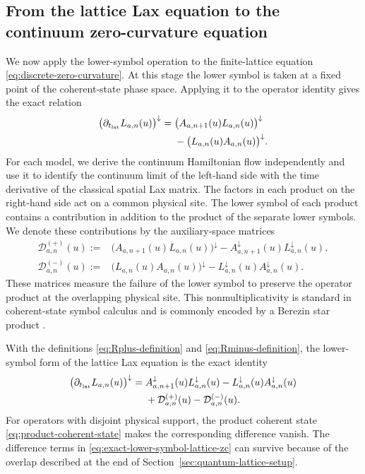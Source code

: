 \subsection{From the lattice Lax equation to the continuum zero-curvature equation}
\label{sec:lattice-to-continuum-zc}

We now apply the lower-symbol operation to the finite-lattice equation
\eqref{eq:discrete-zero-curvature}.  At this stage the lower symbol is taken at
a fixed point of the coherent-state phase space.  Applying it to the operator
identity gives the exact relation
\begin{align}
\bigl(\partial_{t_{\rm lat}}L_{a,n}(u)\bigr)^{\downarrow}
={}&
\bigl(A_{a,n+1}(u)L_{a,n}(u)\bigr)^{\downarrow}
\nonumber\\
&-
\bigl(L_{a,n}(u)A_{a,n}(u)\bigr)^{\downarrow}.
\label{eq:lower-symbol-discrete-zc}
\end{align}
For each model, we derive the continuum Hamiltonian flow independently and
use it to identify the continuum limit of the left-hand side with the time
derivative of the classical spatial Lax matrix.  The factors in each
product on the right-hand side act on a common physical site.  The lower
symbol of each product contains a contribution in addition to the product
of the separate lower symbols.  We denote these contributions by the
auxiliary-space matrices
\begin{align}
\mathcal D^{(+)}_{a,n}(u)
:={}&
\bigl(A_{a,n+1}(u)L_{a,n}(u)\bigr)^{\downarrow}
-
A_{a,n+1}^{\downarrow}(u)L_{a,n}^{\downarrow}(u),
\label{eq:Rplus-definition}\\
\mathcal D^{(-)}_{a,n}(u)
:={}&
\bigl(L_{a,n}(u)A_{a,n}(u)\bigr)^{\downarrow}
-
L_{a,n}^{\downarrow}(u)A_{a,n}^{\downarrow}(u).
\label{eq:Rminus-definition}
\end{align}
These matrices measure the failure of the lower symbol to preserve the
operator product at the overlapping physical site.  This nonmultiplicativity
is standard in coherent-state symbol calculus and is commonly encoded by a
Berezin star product \cite{Schlichenmaier2010}.

With the definitions \eqref{eq:Rplus-definition} and
\eqref{eq:Rminus-definition}, the lower-symbol form of the lattice Lax
equation is the exact identity
\begin{align}
\bigl(\partial_{t_{\rm lat}}L_{a,n}(u)\bigr)^{\downarrow}
={}&
A_{a,n+1}^{\downarrow}(u)L_{a,n}^{\downarrow}(u)
-
L_{a,n}^{\downarrow}(u)A_{a,n}^{\downarrow}(u)
\nonumber\\
&+
\mathcal D^{(+)}_{a,n}(u)-\mathcal D^{(-)}_{a,n}(u).
\label{eq:exact-lower-symbol-lattice-zc}
\end{align}
For operators with disjoint physical support, the product coherent state
\eqref{eq:product-coherent-state} makes the corresponding difference vanish.
The difference terms in \eqref{eq:exact-lower-symbol-lattice-zc} can survive because
of the overlap described at the end of Section~\ref{sec:quantum-lattice-setup}.

